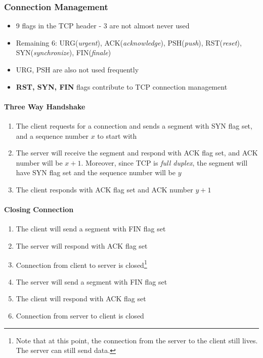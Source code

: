 \subsubsection{Connection Management}
\begin{itemize}
	\item 9 flags in the TCP header - 3 are not almost never used
	\item Remaining 6: URG(\textit{urgent}), ACK(\textit{acknowledge}), PSH(\textit{push}), RST(\textit{reset}), SYN(\textit{synchronize}), FIN(\textit{finale})
	\item URG, PSH are also not used frequently
	\item \textbf{RST, SYN, FIN} flags contribute to TCP connection management
\end{itemize}

\paragraph{Three Way Handshake}
\begin{enumerate}
	\item The client requests for a connection and sends a segment with SYN flag set, and a sequence number $x$ to start with
	\item The server will receive the segment and respond with ACK flag set, and ACK number will be $x+1$. Moreover, since TCP is \textit{full duplex}, the segment will have SYN flag set and the sequence number will be $y$
	\item The client responds with ACK flag set and ACK number $y+1$
\end{enumerate}

\paragraph{Closing Connection}
\begin{enumerate}
	\item The client will send a segment with FIN flag set
	\item The server will respond with ACK flag set
	\item Connection from client to server is closed\footnote{Note that at this point, the connection from the server to the client still lives. The server can still send data.}
	\item The server will send a segment with FIN flag set
	\item The client will respond with ACK flag set
	\item Connection from server to client is closed
\end{enumerate}

